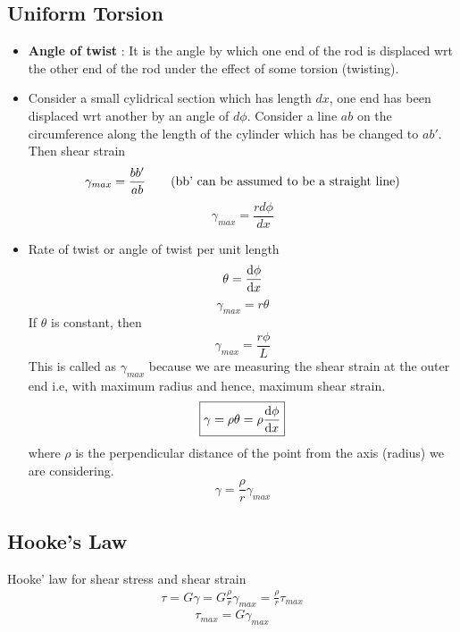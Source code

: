 \documentclass{article}
\begin{document}
	\subsection{Uniform Torsion}
	\begin{itemize}
		\item \textbf{Angle of twist} : It is the angle by which one end of the rod is displaced wrt the other end of the rod under the effect of some torsion (twisting).
		\item Consider a small cylidrical section which has length $dx$, one end has been displaced wrt another by an angle of $d\phi$. Consider a line $ab$ on the circumference along the length of the cylinder which has be changed to $ab'$. Then shear strain 
		\begin{equation*}
			\gamma_{max} = \frac{bb'}{ab} \qquad (\text{bb' can be assumed to be a straight line})\\
		\end{equation*}
			\[\boxed{\gamma_{max} = \frac{r d\phi}{dx}}\]


		\item Rate of twist or angle of twist per unit length
		\[\theta = \dv{\phi}{x}\]
		\[\gamma_{max} = r \theta\]
		If $\theta$ is constant, then
		\[\gamma_{max}= \frac{r \phi}{L}\] 
		This is called as $\gamma_{max}$ because we are measuring the shear strain at the outer end i.e, with maximum radius and hence, maximum shear strain.
		\[\boxed{\gamma = \rho \theta = \rho \dv{\phi}{x}}\]
		where $\rho$ is the perpendicular distance of the point from the axis (radius) we are considering.
		\[\boxed{\gamma = \frac{\rho}{r} \gamma_{max} }\]

	\end{itemize}
	\subsection{Hooke's Law}
		Hooke' law for shear stress and shear strain
		\begin{align*}
			\tau = G \gamma
				 = G \frac{\rho}{r}\gamma_{max}
				 = \frac{\rho}{r}\tau_{max}
		\end{align*}
		\[\tau_{max} = G \gamma_{max}\]
\end{document}
